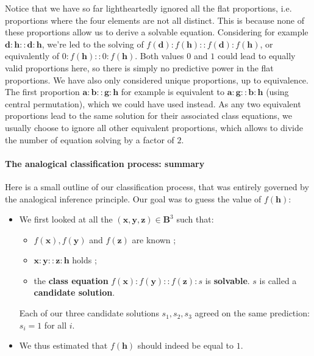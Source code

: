 Notice that we have so far lightheartedly ignored  all the flat proportions,
i.e. proportions where the four elements are not all distinct.
This is because none of these proportions allow us to derive a solvable
equation. Considering for example $\mathbf{d} : \mathbf{h} :: \mathbf{d} :
\mathbf{h}$, we're led to the solving of $f(\mathbf{d}) : f(\mathbf{h}) ::
f(\mathbf{d}) : f(\mathbf{h})$, or equivalently of $0 : f(\mathbf{h}) :: 0 :
f(\mathbf{h})$. Both values $0$ and $1$ could lead to equally valid proportions
here, so there is simply no predictive power in the flat proportions. We have
also only considered unique proportions, up to equivalence. The first proportion
$\mathbf{a} : \mathbf{b} :: \mathbf{g} : \mathbf{h}$ for example is equivalent
to $\mathbf{a} : \mathbf{g} :: \mathbf{b} : \mathbf{h}$ (using central
permutation), which we could have
used instead. As any two equivalent proportions lead to the same solution for
their associated class equations, we usually choose to ignore all other equivalent
proportions, which allows to divide the number of equation solving by a factor
of $2$.

\paragraph{The analogical classification process: summary\\}

Here is a small outline of our classification process, that was entirely
governed by the analogical inference principle. Our goal was to guess the value
of $f(\mathbf{h})$:

\begin{itemize}
  \item We first looked at all the $(\mathbf{x}, \mathbf{y}, \mathbf{z}) \in
    \mathbf{B}^3$ such that:
    \begin{itemize}
      \item $f(\mathbf{x}), f(\mathbf{y})$ and $f(\mathbf{z})$ are known ;
      \item $\mathbf{x}:\mathbf{y}::\mathbf{z}:\mathbf{h}$ holds ;
      \item the \textbf{class equation} $f(\mathbf{x}) :f(\mathbf{y}) ::
        f(\mathbf{z}) :s$ is \textbf{solvable}. $s$ is called a
        \textbf{candidate solution}.
    \end{itemize}
    Each of our three candidate solutions $s_1, s_2, s_3$ agreed on the same prediction:
    $s_i = 1$ for all $i$.
  \item We thus estimated that $f(\mathbf{h})$ should indeed be equal to $1$.
\end{itemize}


